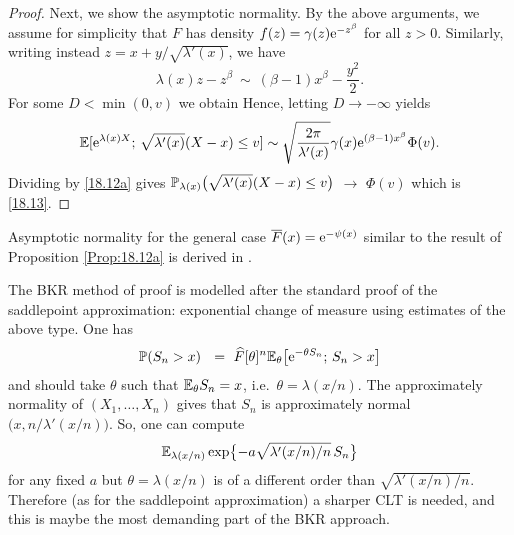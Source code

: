 \begin{proof}
	Next, we show the asymptotic normality. By the above arguments, we assume for simplicity  that $F$ has density $f(z)=\gamma(z) \mathrm{e}^{-z^\beta} $ for all $z>0$. Similarly,
	writing instead $z=x+y/\sqrt{\lambda'(x)}$, we have
	\[\lambda(x) z-z^\beta\ \sim \ (\beta-1)x^\beta-\frac{y^2}{2} .\]
	For some $D< \min(0,v)$ we obtain
	Hence, letting $D\to - \infty$ yields
	$$ 	\mathbb{E}[\mathrm{e}^{\lambda(x)X};\, \sqrt{\lambda'(x)}(X-x)\le v]
	\sim \sqrt{\frac{2\pi}{\lambda'(x)}} \gamma(x) \mathrm{e}^{(\beta-1)x^\beta}\Phi(v).
	$$
	Dividing by \eqref{18.12a} gives $\mathbb{P}_{\lambda(x)}\bigl(\sqrt{\lambda'(x)}(X-x)\le v\bigr)$ $\to$ $\Phi(v)$
	which is \eqref{18.13}.
\end{proof}



\begin{remark}\label{Rem:Lo}
	Asymptotic normality for the general case $\overline{F}(x)= \mathrm{e}^{-\psi(x)}$ similar to the result of Proposition \ref{Prop:18.12a} is derived in \cite{balkema2003domains}.
\halmoss\end{remark}


\begin{remark}\label{Rem:21.12a} The BKR method of proof is modelled after the standard
	proof of the saddlepoint approximation: exponential change of measure using estimates of the above type.
	One has
	\begin{equation}\label{21.12b}
	\Prob(S_n>x)\ \ =\ \widehat{F}[\theta]^n\Exp_\theta\bigl[\e^{-\theta S_n};\, S_n>x\bigr]
	\end{equation}
	and should take $\theta$ such that $\mathbb{E}_\theta S_n=x$, i.e.\ $\theta=\lambda(x/n)$.
	The approximately normality of $(X_1,\ldots,X_n)$ gives that $S_n$ is approximately normal
	$\bigl(x,n/\lambda'(x/n)\bigr)$. So, one can compute
	\[\mathbb{E}_{\lambda(x/n)}\exp\bigl\{-a\sqrt{\lambda'(x/n)/n}\,S_n\bigr\}\]
	for any fixed $a$
	but $\theta=\lambda(x/n)$ is of a different order than $\sqrt{\lambda'(x/n)/n}$. Therefore
	(as for the saddlepoint approximation) a sharper CLT is needed, and
	this is maybe the most demanding part of the BKR approach.	\halmoss\end{remark}\


